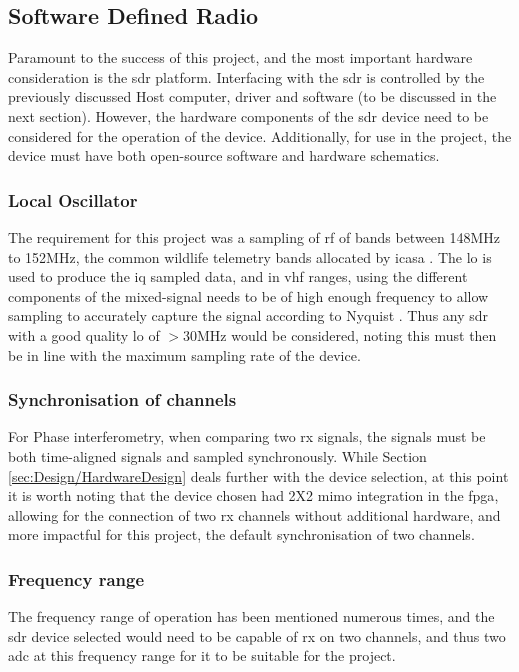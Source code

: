 \documentclass[class=report,11pt,crop=false]{standalone}
\begin{document}
\subsection{Software Defined Radio\label{sec:IQ}}
Paramount to the success of this project, and the most important hardware consideration is the \gls{sdr} platform. Interfacing with the \gls{sdr} is controlled by the previously discussed Host computer, driver and software (to be discussed in the next section). However, the hardware components of the \gls{sdr} device need to be considered for the operation of the device. Additionally, for use in the project, the device must have both open-source software and hardware schematics.

\subsubsection{Local Oscillator}
The requirement for this project was a sampling of \gls{rf} of bands between 148MHz to 152MHz, the common wildlife telemetry bands allocated by \gls{icasa} \cite{wild-life-telem}. The \gls{lo} is used to produce the \gls{iq} sampled data, and in \gls{vhf} ranges, using the different components of the mixed-signal needs to be of high enough frequency to allow sampling to accurately capture the signal according to Nyquist \cite{engineers-dsp}. Thus any \gls{sdr} with a good quality \gls{lo} of $>30$MHz would be considered, noting this must then be in line with the maximum sampling rate of the device. 

\subsubsection{Synchronisation of channels}
For Phase interferometry, when comparing two \gls{rx} signals, the signals must be both time-aligned signals and sampled synchronously. 
While Section \ref{sec:Design/HardwareDesign} deals further with the device selection, at this point it is worth noting that the device chosen had 2X2 \gls{mimo} integration in the \gls{fpga}, allowing for the connection of two \gls{rx} channels without additional hardware, and more impactful for this project, the default synchronisation of two channels. 

\subsubsection{Frequency range}
The frequency range of operation has been mentioned numerous times, and the \gls{sdr} device selected would need to be capable of \gls{rx} on two channels, and thus two \gls{adc} at this frequency range for it to be suitable for the project. 
\end{document}
